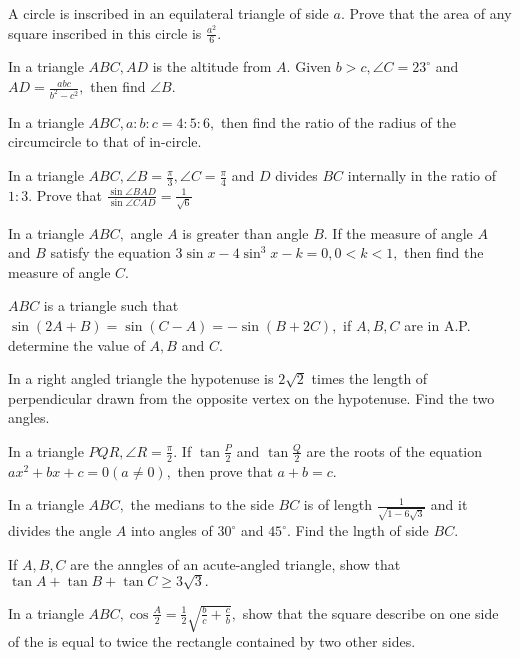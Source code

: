 \item A circle is inscribed in an equilateral triangle of side $a.$ Prove that the area of any square inscribed in this circle
   is $\frac{a^2}{6}.$

\item In a triangle $ABC, AD$ is the altitude from $A.$ Given $b > c, \angle C = 23^\circ$ and $AD =
   \frac{abc}{b^2 - c^2},$ then find $\angle B.$

\item In a triangle $ABC, a:b:c = 4:5:6,$ then find the ratio of the radius of the circumcircle to that of in-circle.

\item In a triangle $ABC, \angle B = \frac{\pi}{3}, \angle C= \frac{\pi}{4}$ and $D$ divides $BC$ internally in the
   ratio of $1:3.$ Prove that $\frac{\sin\angle BAD}{\sin\angle CAD} = \frac{1}{\sqrt{6}}$

\item In a triangle $ABC,$ angle $A$ is greater than angle $B.$ If the measure of angle $A$ and $B$
   satisfy the equation $3\sin x - 4\sin^3x - k = 0, 0< k < 1,$ then find the measure of angle $C.$

\item $ABC$ is a triangle such that $\sin(2A + B) = \sin(C - A) = -\sin(B + 2C),$ if $A, B, C$ are in A.P. determine
   the value of $A, B$ and $C.$

\item In a right angled triangle the hypotenuse is $2\sqrt{2}$ times the length of perpendicular drawn from the opposite vertex
   on the hypotenuse. Find the two angles.

\item In a triangle $PQR, \angle R = \frac{\pi}{2}.$ If $\tan\frac{P}{2}$ and $\tan\frac{Q}{2}$ are the roots of the
   equation $ax^2 + bx + c = 0(a\neq 0),$ then prove that $a + b = c.$

\item In a triangle $ABC,$ the medians to the side $BC$ is of length $\frac{1}{\sqrt{1 - 6\sqrt{3}}}$ and it divides
   the angle $A$ into angles of $30^\circ$ and $45^\circ.$ Find the lngth of side $BC.$

\item If $A, B, C$ are the anngles of an acute-angled triangle, show that $\tan A + \tan B + \tan C \geq 3\sqrt{3}.$

\item In a triangle $ABC, \cos \frac{A}{2} = \frac{1}{2}\sqrt{\frac{b}{c} + \frac{c}{b}},$ show that the square describe on one
   side of the is equal to twice the rectangle contained by two other sides.

